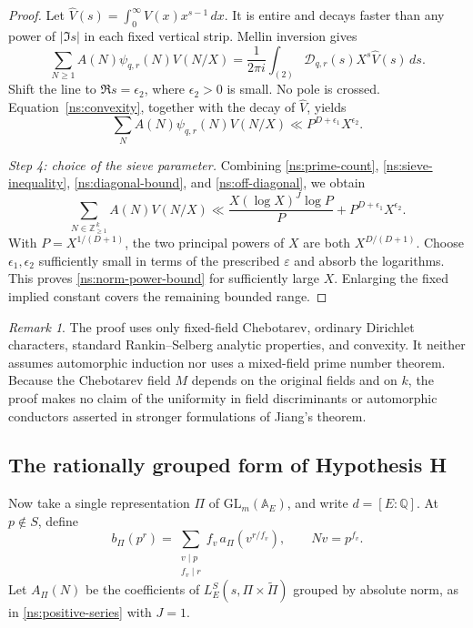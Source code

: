 \documentclass[11pt,reqno]{amsart}
\numberwithin{equation}{section}
\theoremstyle{definition}
\theoremstyle{remark}
\newtheorem{remark}[theorem]{Remark}
\newcommand{\Q}{\mathbb Q}
\begin{document}
\begin{proof}
Let $\widehat V(s)=\int_0^\infty V(x)x^{s-1}\,dx$. It is entire and decays faster than any power of $|\Im s|$ in each fixed vertical strip. Mellin inversion gives
\begin{equation}\label{ns:mellin}
\sum_{N\ge1}A(N)\psi_{q,r}(N)V(N/X)
=\frac1{2\pi i}\int_{(2)}\mathcal D_{q,r}(s)X^s\widehat V(s)\,ds.
\end{equation}
Shift the line to $\Re s=\epsilon_2$, where $\epsilon_2>0$ is small. No pole is crossed. Equation~\eqref{ns:convexity}, together with the decay of $\widehat V$, yields
\begin{equation}\label{ns:off-diagonal}
\sum_NA(N)\psi_{q,r}(N)V(N/X)
\ll P^{D+\epsilon_1}X^{\epsilon_2}.
\end{equation}

\emph{Step 4: choice of the sieve parameter.}
Combining \eqref{ns:prime-count}, \eqref{ns:sieve-inequality}, \eqref{ns:diagonal-bound}, and \eqref{ns:off-diagonal}, we obtain
\begin{equation}\label{ns:pre-optimization}
\sum_{N\in\mathbb Z_{\ge1}^{\,k}}A(N)V(N/X)
\ll\frac{X(\log X)^J\log P}{P}+P^{D+\epsilon_1}X^{\epsilon_2}.
\end{equation}
With $P=X^{1/(D+1)}$, the two principal powers of $X$ are both $X^{D/(D+1)}$. Choose $\epsilon_1,\epsilon_2$ sufficiently small in terms of the prescribed $\varepsilon$ and absorb the logarithms. This proves \eqref{ns:norm-power-bound} for sufficiently large $X$. Enlarging the fixed implied constant covers the remaining bounded range.
\end{proof}

\begin{remark}\label{ns:fixed-data-scope}
The proof uses only fixed-field Chebotarev, ordinary Dirichlet characters, standard Rankin--Selberg analytic properties, and convexity. It neither assumes automorphic induction nor uses a mixed-field prime number theorem. Because the Chebotarev field $M$ depends on the original fields and on $k$, the proof makes no claim of the uniformity in field discriminants or automorphic conductors asserted in stronger formulations of Jiang's theorem.
\end{remark}

\subsection{The rationally grouped form of Hypothesis H}

Now take a single representation $\Pi$ of $\mathrm{GL}_m(\mathbb A_E)$, and write $d=[E:\Q]$. At $p\notin S$, define
\begin{equation}\label{ns:grouped-coeff}
b_\Pi(p^r)=\sum_{\substack{v\mid p\\f_v\mid r}}
 f_v\,a_\Pi(v^{r/f_v}),\qquad Nv=p^{f_v}.
\end{equation}
Let $A_\Pi(N)$ be the coefficients of $L_E^S(s,\Pi\times\widetilde\Pi)$ grouped by absolute norm, as in \eqref{ns:positive-series} with $J=1$.
\end{document}
